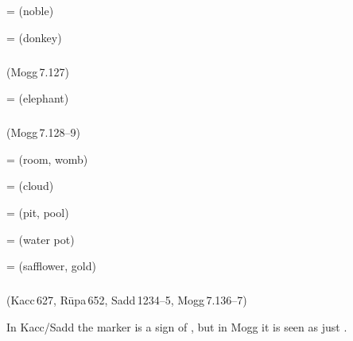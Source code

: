  =  (noble)\par
{} =  (donkey)\par

\subparagraph*{} (Mogg\,7.127)\label{pacckx:bhaka}

 =  (elephant)\par

\subparagraph*{} (Mogg\,7.128--9)\label{pacckx:bha}

 =  (room, womb)\par
{} =  (cloud)\par
{} =  (pit, pool)\par
{} =  (water pot)\par
{} =  (safflower, gold)\par

\subparagraph*{} (Kacc\,627, R\=upa\,652, Sadd\,1234--5, Mogg\,7.136--7)\label{pacckx:man}\label{pacckx:ma1}

In Kacc/Sadd the marker  is a sign of , but in Mogg it is seen as just .

